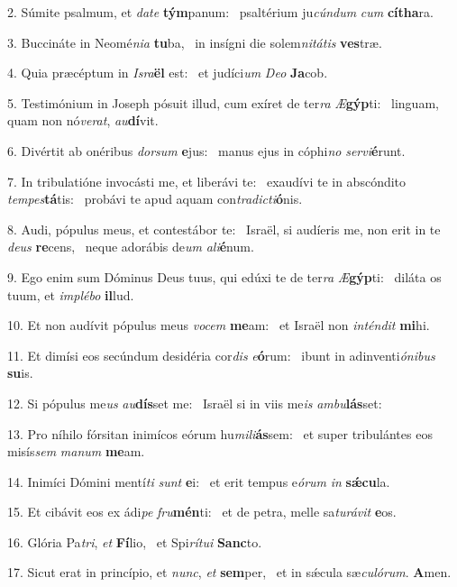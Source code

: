 2. Súmite psalmum, et \textit{da}\textit{te} \textbf{tým}panum: \ast\  psaltérium ju\textit{cún}\textit{dum} \textit{cum} \textbf{cí}\textbf{tha}ra.\

3. Buccináte in Neomé\textit{ni}\textit{a} \textbf{tu}ba, \ast\  in insígni die solem\textit{ni}\textit{tá}\textit{tis} \textbf{ves}træ.\

4. Quia præcéptum in \textit{Is}\textit{ra}\textbf{ël} est: \ast\  et judíci\textit{um} \textit{De}\textit{o} \textbf{Ja}cob.\

5. Testimónium in Joseph pósuit illud, cum exíret de ter\textit{ra} \textit{Æ}\textbf{gýp}ti: \ast\  linguam, quam non nó\textit{ve}\textit{rat}, \textit{au}\textbf{dí}vit.\

6. Divértit ab onéribus \textit{dor}\textit{sum} \textbf{e}jus: \ast\  manus ejus in cóphi\textit{no} \textit{ser}\textit{vi}\textbf{é}runt.\

7. In tribulatióne invocásti me, et liberávi te: \dag\  exaudívi te in abscóndito \textit{tem}\textit{pes}\textbf{tá}tis: \ast\  probávi te apud aquam con\textit{tra}\textit{dic}\textit{ti}\textbf{ó}nis.\

8. Audi, pópulus meus, et contestábor te: \dag\  Israël, si audíeris me, non erit in te \textit{de}\textit{us} \textbf{re}cens, \ast\  neque adorábis de\textit{um} \textit{a}\textit{li}\textbf{é}num.\

9. Ego enim sum Dóminus Deus tuus, qui edúxi te de ter\textit{ra} \textit{Æ}\textbf{gýp}ti: \ast\  diláta os tuum, et \textit{im}\textit{plé}\textit{bo} \textbf{il}lud.\

10. Et non audívit pópulus meus \textit{vo}\textit{cem} \textbf{me}am: \ast\  et Israël non \textit{in}\textit{tén}\textit{dit} \textbf{mi}hi.\

11. Et dimísi eos secúndum desidéria cor\textit{dis} \textit{e}\textbf{ó}rum: \ast\  ibunt in adinventi\textit{ó}\textit{ni}\textit{bus} \textbf{su}is.\

12. Si pópulus me\textit{us} \textit{au}\textbf{dís}set me: \ast\  Israël si in viis me\textit{is} \textit{am}\textit{bu}\textbf{lás}set:\

13. Pro níhilo fórsitan inimícos eórum hu\textit{mi}\textit{li}\textbf{ás}sem: \ast\  et super tribulántes eos misís\textit{sem} \textit{ma}\textit{num} \textbf{me}am.\

14. Inimíci Dómini mentí\textit{ti} \textit{sunt} \textbf{e}i: \ast\  et erit tempus e\textit{ó}\textit{rum} \textit{in} \textbf{sǽ}\textbf{cu}la.\

15. Et cibávit eos ex ádi\textit{pe} \textit{fru}\textbf{mén}ti: \ast\  et de petra, melle sa\textit{tu}\textit{rá}\textit{vit} \textbf{e}os.\

16. Glória Pa\textit{tri}, \textit{et} \textbf{Fí}lio, \ast\  et Spi\textit{rí}\textit{tu}\textit{i} \textbf{Sanc}to.\

17. Sicut erat in princípio, et \textit{nunc}, \textit{et} \textbf{sem}per, \ast\  et in sǽcula sæ\textit{cu}\textit{ló}\textit{rum}. \textbf{A}men.\

